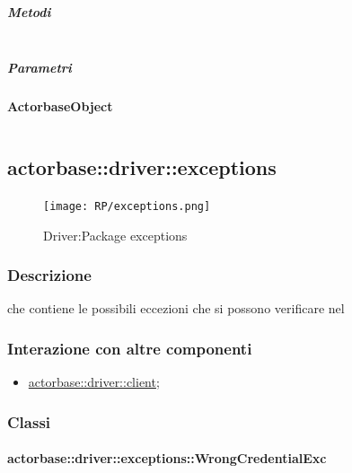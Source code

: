 \documentclass{scalatekids-article}
\begin{document}
\subparagraph{Metodi}


\begin{tabular}{| p{3cm} | p{1.5cm} | p{2.5cm} | p{10cm} |}
  \hline
\end{tabular}

\subparagraph{Parametri}


\begin{center}
  \textbf{ActorbaseObject}
\end{center}
\begin{tabular}{| l | l | l |}
  \hline
\end{tabular}


\subsection{actorbase::driver::exceptions}
\label{sec:actorbase::driver::exceptions}

\begin{figure}[H]
  \begin{center}
    \texttt{[image: RP/exceptions.png]}
    \caption{Driver:Package exceptions}
  \end{center}
\end{figure}

\subsubsection{Descrizione}

 che contiene le possibili eccezioni che si possono verificare nel 

\subsubsection{Interazione con altre componenti}
\begin{itemize}
\item \hyperref[sec:actorbase::driver::client]{actorbase::driver::client};
\end{itemize}

\subsubsection{Classi}

\paragraph{actorbase::driver::exceptions::WrongCredentialExc}
\end{document}
